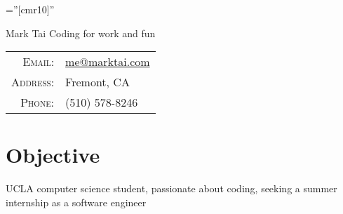 \documentclass[a4paper,10pt]{article}
\begin{document}

\pagestyle{empty} %

\font\fb=''[cmr10]'' %



\begin{minipage}{0.7\textwidth}%
\par{
	{\fontsize{40}{50}\selectfont Mark Tai}
	\Large \hspace{.2em} Coding for work and fun
    }
\end{minipage}%
\hfill%
\begin{minipage}{0.3\textwidth}
\begin{tabular}{r|l}
    \textsc{Email:}     & \href{mailto:me@marktai.com}{me@marktai.com} \\
    \textsc{Address:}   & Fremont, CA \\
    \textsc{Phone:}     & (510) 578-8246\\
\end{tabular}
\end{minipage}

\section{Objective}
UCLA computer science student, passionate about coding, seeking a summer internship as a software engineer
\end{document}
